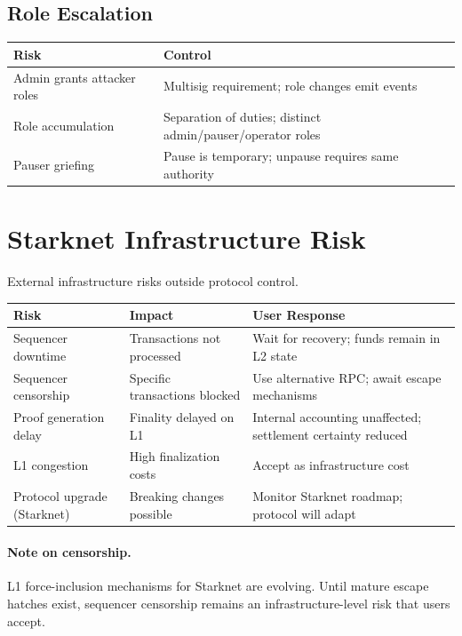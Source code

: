 \subsection{Role Escalation}

\begin{center}
\begin{tabular}{ll}
\toprule
\textbf{Risk} & \textbf{Control} \\
\midrule
Admin grants attacker roles & Multisig requirement; role changes emit events \\
Role accumulation & Separation of duties; distinct admin/pauser/operator roles \\
Pauser griefing & Pause is temporary; unpause requires same authority \\
\bottomrule
\end{tabular}
\end{center}

\section{Starknet Infrastructure Risk}

External infrastructure risks outside protocol control.

\begin{center}
\begin{tabularx}{\textwidth}{l >{\raggedright\arraybackslash}X >{\raggedright\arraybackslash}X}
\toprule
\textbf{Risk} & \textbf{Impact} & \textbf{User Response} \\
\midrule
Sequencer downtime & Transactions not processed & Wait for recovery; funds remain in L2 state \\
Sequencer censorship & Specific transactions blocked & Use alternative RPC; await escape mechanisms \\
Proof generation delay & Finality delayed on L1 & Internal accounting unaffected; settlement certainty reduced \\
L1 congestion & High finalization costs & Accept as infrastructure cost \\
Protocol upgrade (Starknet) & Breaking changes possible & Monitor Starknet roadmap; protocol will adapt \\
\bottomrule
\end{tabularx}
\end{center}

\paragraph{Note on censorship.} L1 force-inclusion mechanisms for Starknet are evolving. Until mature escape hatches exist, sequencer censorship remains an infrastructure-level risk that users accept.

